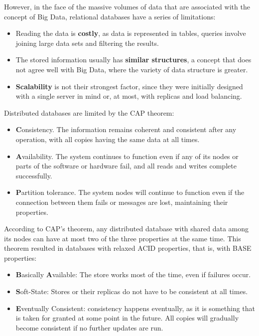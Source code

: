 \nonzeroparskip However, in the face of the massive volumes of data that are associated with the concept of Big Data, relational databases have a series of limitations:
\begin{itemize}
	\item Reading the data is \textbf{costly}, as data is represented in tables, queries involve joining large data sets and filtering the results.
	\item The stored information usually has \textbf{similar structures}, a concept that does not agree well with Big Data, where the variety of data structure is greater.
	\item \textbf{Scalability} is not their strongest factor, since they were initially designed with a single server in mind or, at most, with replicas and load balancing.
\end{itemize}

\nonzeroparskip Distributed databases are limited by the CAP theorem:
\begin{itemize}
	\item \textbf{C}onsistency. The information remains coherent and consistent after any operation, with all copies having the same data at all times.
	\item \textbf{A}vailability. The system continues to function even if any of its nodes or parts of the software or hardware fail, and all reads and writes complete successfully.
	\item \textbf{P}artition tolerance. The system nodes will continue to function even if the connection between them fails or messages are lost, maintaining their properties.
\end{itemize}

\nonzeroparskip According to CAP's theorem, any distributed database with shared data among its nodes can have at most two of the three properties at the same time. This theorem resulted in databases with relaxed ACID properties, that is, with BASE properties:
\begin{itemize}
	\item \textbf{B}asically \textbf{A}vailable: The store works most of the time, even if failures occur.
	\item \textbf{S}oft-State: Stores or their replicas do not have to be consistent at all times.
	\item \textbf{E}ventually Consistent: consistency happens eventually, as it is something that is taken for granted at some point in the future. All copies will gradually become consistent if no further updates are run.
\end{itemize}

